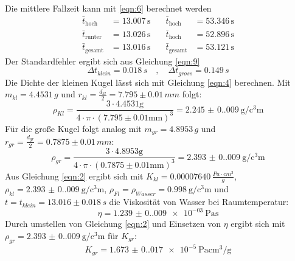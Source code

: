 Die mittlere Fallzeit kann mit \eqref{eqn:6} berechnet werden\\
\begin{align*}
  \bar{t}_{\text{hoch}} &= 13.007\,\unit{\second}  \quad &\bar{t}_{\text{hoch}} &= 53.346\,\unit{\second}\\
  \bar{t}_{\text{runter}} &= 13.026\,\unit{\second}  \quad &\bar{t}_{\text{hoch}} &= 52.896\,\unit{\second}\\
  \bar{t}_{\text{gesamt}} &= 13.016\,\unit{\second}  \quad &\bar{t}_{\text{gesamt}} &= 53.121\,\unit{\second}
\end{align*}
Der Standardfehler ergibt sich aus Gleichung \eqref{eqn:9}
\begin{equation*}
  Δt_{klein} = 0.018\,\unit{s} \quad , \quad Δt_{gross} = 0.149\,\unit{s}
\end{equation*}
Die Dichte der kleinen Kugel lässt sich mit Gleichung \eqref{eqn:4} berechnen. Mit $m_{kl} = 4.4531\,\unit{g}$ und $r_{kl} = \frac{d_{kl}}{2} = 7.795 \pm 0.01\,\unit{mm}$ folgt:
\begin{equation*}
  ρ_{Kl} = \frac{3 \cdot 4.4531 \unit{\gram}}{4 \cdot π \cdot (7.795 \pm 0.01 \unit{\milli\meter})^3} = \SI{2.245(0.009)}{\g\per\cubic\centi\metre}
\end{equation*}\label{eqn:13}
Für die große Kugel folgt analog mit $m_{gr} = 4.8953\,\unit{g}$ und $r_{gr} = \frac{d_{gr}}{2} = 0.7875 \pm 0.01\,\unit{mm}$:
\begin{equation*}
  ρ_{gr} = \frac{3 \cdot 4.8953 \unit{\gram}}{4 \cdot π \cdot (0.7875 \pm 0.01 \unit{\milli\meter})^3} = \SI{2.393(0.009)}{\g\per\cubic\centi\metre}
\end{equation*}\label{eqn:13}
Aus Gleichung \eqref{eqn:2} ergibt sich mit $K_{kl} = 0.00007640\,\unit{\frac{Pa \cdot cm^3}{g}}$, $\rho_{kl} = \SI{2.393(0.009)}{\g\per\cubic\centi\metre}$, $\rho_{Fl} = \rho_{Wasser} = \SI{0.998}{\g\per\cubic\centi\metre}$ und $t = t_{klein} = 13.016 \pm 0.018\,\unit{s}$ die Viskosität von Wasser bei Raumtemperatur:
\begin{equation*}
  η = \SI{1.239(0.009)e-03}{\pascal\s}
\end{equation*}
Durch umstellen von Gleichung \eqref{eqn:2} und Einsetzen von $η$ ergibt sich mit $ρ_{gr} = \SI{2.393(0.009)}{\g\per\cubic\centi\metre}$ für $K_{gr}$:
\begin{equation*}
  K_{gr} = \SI{1.673(0.017)e-5}{\pascal\centi\cubic\meter\per\gram}
\end{equation*}
\newpage

